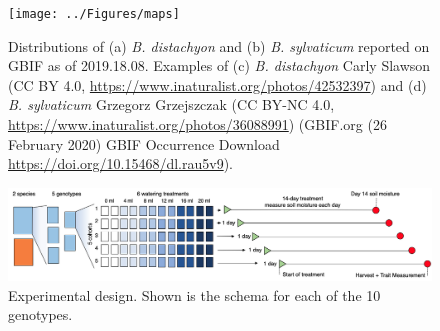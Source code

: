 \documentclass[jou,floatsintext]{apa6}
\begin{document}
\begin{figure}[!h]
\texttt{[image: ../Figures/maps]} \caption{Distributions of (a) \emph{B. distachyon} and (b) \emph{B. sylvaticum} reported on GBIF as of 2019.18.08. Examples of (c) \emph{B. distachyon} Carly Slawson (CC BY 4.0, \url{https://www.inaturalist.org/photos/42532397}) and (d) \emph{B. sylvaticum} Grzegorz Grzejszczak (CC BY-NC 4.0, \url{https://www.inaturalist.org/photos/36088991}) (GBIF.org (26 February 2020) GBIF Occurrence Download \url{https://doi.org/10.15468/dl.rau5v9}).}\label{fig:maps}
\end{figure}



\begin{figure}[!h]
\includegraphics[width=\textwidth]{../Figures/design} \caption{Experimental design. Shown is the schema for each of the 10 genotypes.}\label{fig:racks}
\end{figure}
\end{document}
